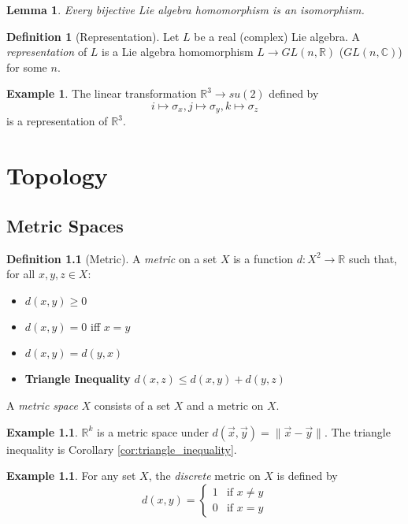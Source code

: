 \documentclass{book}
\newtheorem{lm}[prop]{Lemma}
\theoremstyle{definition}
\newtheorem{df}[prop]{Definition}
\newtheorem{ex}[prop]{Example}
\begin{document}
\begin{lm}
Every bijective Lie algebra homomorphism is an isomorphism.
\end{lm}


\begin{df}[Representation]
Let $L$ be a real (complex) Lie algebra. A \emph{representation} of $L$ is a Lie algebra homomorphism $L \rightarrow GL(n, \mathbb{R})$ ($GL(n, \mathbb{C})$) for some $n$.
\end{df}

\begin{ex}
The linear transformation $\mathbb{R}^3 \rightarrow su(2)$ defined by
\[ i \mapsto \sigma_x, j \mapsto \sigma_y, k \mapsto \sigma_z \]
is a representation of $\mathbb{R}^3$.
\end{ex}

\part{Topology}

\chapter{Metric Spaces}

\begin{df}[Metric]
A \emph{metric} on a set $X$ is a function $d : X^2 \rightarrow \mathbb{R}$ such that, for all $x,y,z \in X$:
\begin{itemize}
\item $d(x,y) \geq 0$
\item $d(x,y) = 0$ iff $x = y$
\item $d(x,y) = d(y,x)$
\item \textbf{Triangle Inequality} $d(x,z) \leq d(x,y) + d(y,z)$
\end{itemize}

A \emph{metric space} $X$ consists of a set $X$ and a metric on $X$.
\end{df}

\begin{ex}
$\mathbb{R}^k$ is a metric space under $d(\vec{x},\vec{y}) = \| \vec{x} - \vec{y} \|$. The triangle inequality is Corollary \ref{cor:triangle_inequality}.
\end{ex}

\begin{ex}
For any set $X$, the \emph{discrete} metric on $X$ is defined by
\[ d(x,y) = \begin{cases}
1 & \text{if } x \neq y \\
0 & \text{if } x = y
\end{cases} \]
\end{ex}
\end{document}
